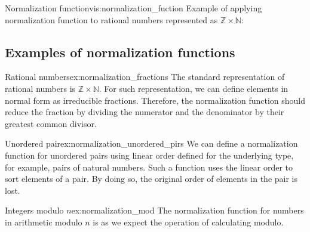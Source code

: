 \begin{vis}[B]{Normalization function}{vis:normalization_fuction}
Example of applying normalization function to rational numbers represented as $\mathbb{Z} \times \mathbb{N}$:
\begin{center}
\end{center}
\end{vis}

\subsection{Examples of normalization functions}
\begin{example}{Rational numbers}{ex:normalization_fractions}
The standard representation of rational numbers is $\mathbb{Z} \times \mathbb{N}$. For such representation, we can define elements in normal form as irreducible fractions. Therefore, the normalization function should reduce the fraction by dividing the numerator and the denominator by their greatest common divisor.
\end{example}
\begin{example}{Unordered pair}{ex:normalization_unordered_pirs}
We can define a normalization function for unordered pairs using linear order defined for the underlying type, for example, pairs of natural numbers. Such a function uses the linear order to sort elements of a pair. By doing so, the original order of elements in the pair is lost.
\end{example}
\begin{example}{Integers modulo $n$}{ex:normalization_mod}
The normalization function for numbers in arithmetic modulo $n$ is as we expect the operation of calculating modulo.
\end{example}

